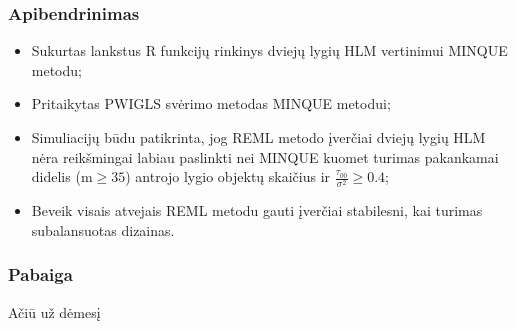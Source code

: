 \documentclass[utf8,hyperref={unicode,pdftex}]{beamer}
\begin{document}
\begin{frame}
\frametitle{Apibendrinimas}
\begin{itemize}
\item Sukurtas lankstus R funkcijų rinkinys dviejų lygių HLM vertinimui MINQUE metodu;
\item Pritaikytas PWIGLS svėrimo metodas MINQUE metodui;
\item Simuliacijų būdu patikrinta, jog REML metodo įverčiai dviejų lygių HLM nėra reikšmingai labiau paslinkti nei MINQUE kuomet turimas pakankamai didelis (m$\geq 35$) antrojo lygio objektų skaičius ir $\frac{\tau_{00}}{\sigma^2}\geq 0.4$;
\item Beveik visais atvejais REML metodu gauti įverčiai stabilesni, kai turimas subalansuotas dizainas.

\end{itemize}
\end{frame}

\begin{frame}
\frametitle{Pabaiga}
\huge
Ačiū už dėmesį
\end{frame}
\end{document}

